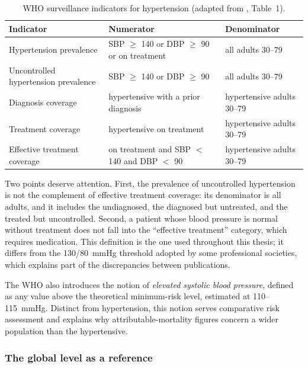 \documentclass[12pt,a4paper,oneside]{report}
\begin{document}
\begin{table}[htbp]
\centering\small
\caption{WHO surveillance indicators for hypertension (adapted from \cite{who2023hypertension}, Table~1).}\label{tab:who-indicators}
\begin{tabularx}{\textwidth}{@{}>{\raggedright\arraybackslash}p{4.2cm} X >{\raggedright\arraybackslash}p{4.2cm}@{}}
\toprule
\textbf{Indicator} & \textbf{Numerator} & \textbf{Denominator} \\
\midrule
Hypertension prevalence & SBP $\geq$ 140 or DBP $\geq$ 90 or on treatment & all adults 30--79 \\
Uncontrolled hypertension prevalence & SBP $\geq$ 140 or DBP $\geq$ 90 & all adults 30--79 \\
Diagnosis coverage & hypertensive with a prior diagnosis & hypertensive adults 30--79 \\
Treatment coverage & hypertensive on treatment & hypertensive adults 30--79 \\
Effective treatment coverage & on treatment and SBP $<$ 140 and DBP $<$ 90 & hypertensive adults 30--79 \\
\bottomrule
\end{tabularx}
\end{table}

Two points deserve attention. First, the prevalence of uncontrolled hypertension is not the complement of effective treatment coverage: its denominator is all adults, and it includes the undiagnosed, the diagnosed but untreated, and the treated but uncontrolled. Second, a patient whose blood pressure is normal without treatment does not fall into the ``effective treatment'' category, which requires medication. This definition is the one used throughout this thesis; it differs from the 130/80~mmHg threshold adopted by some professional societies, which explains part of the discrepancies between publications.

The WHO also introduces the notion of \emph{elevated systolic blood pressure}, defined as any value above the theoretical minimum-risk level, estimated at 110--115~mmHg. Distinct from hypertension, this notion serves comparative risk assessment and explains why attributable-mortality figures concern a wider population than the hypertensive.

\subsubsection{The global level as a reference}
\end{document}
